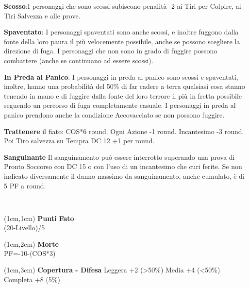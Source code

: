 \documentclass[a4paper,12 pt,openany]{book}
\begin{document}
\begin{textblock*}{19 cm}
\begin{multicols}{2}
			\textbf{Scosso}:I personaggi che sono scossi subiscono penalità -2 ai Tiri per Colpire, ai Tiri Salvezza e alle prove.
			
			\textbf{Spaventato}: I personaggi spaventati sono anche scossi, e inoltre fuggono dalla fonte della loro paura il più velocemente possibile, anche se possono scegliere la direzione di fuga.
			I personaggi che non sono in grado di fuggire possono combattere (anche se continuano ad essere scossi).
			
			\textbf{In Preda al Panico}: I personaggi in preda al panico sono scossi e spaventati, inoltre, hanno una probabilità del 50\% di far cadere a terra qualsiasi cosa stanno tenendo in mano e di fuggire dalla fonte del loro terrore il più in fretta possibile seguendo un percorso di fuga completamente casuale.
			I personaggi in preda al panico prendono anche la condizione Accovacciato se non possono fuggire.
			
			\textbf{Trattenere} il fiato: COS*6 round. Ogni Azione -1 round. Incantesimo -3 round. Poi Tiro salvezza su Tempra DC 12 +1 per round.
			
			\textbf{Sanguinante} Il sanguinamento può essere interrotto superando una prova di Pronto Soccorso con DC 15 o con l'uso di un incantesimo che curi ferite.
			Se non indicato diversamente il danno massimo da sanguinamento, anche cumulato, è di 5 PF a round.
			
		\end{multicols}
		
	\end{textblock*}
	
	~\newpage
	
	\begin{textblock*}{4cm}(1cm,1cm) %
		{\textbf{Punti Fato}\\
			\footnotesize 
			(20-Livello)/5}
	\end{textblock*}	
	
	\begin{textblock*}{4cm}(1cm,2cm) %
		{\textbf{Morte}\\
			\footnotesize 
			PF=-10-(COS*3)}
	\end{textblock*}	

\begin{textblock*}{4cm}(1cm,3cm) %
\textbf{Copertura - Difesa}
Leggera +2 (>50\%)
Media +4 (<50\%)
Completa +8 (5\%)	
	\end{textblock*}	
\end{document}
